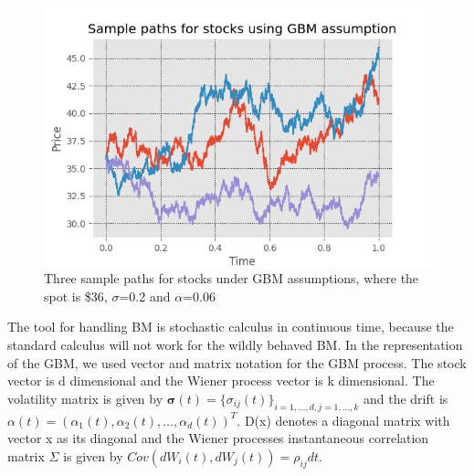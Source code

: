 \begin{figure}[th]
\centering
\includegraphics{Figures/samplePath.png}
\decoRule
\caption[Sample Path For Stocks]{Three sample paths for stocks under GBM assumptions, where the spot is \$36, $\sigma$=0.2 and $\alpha$=0.06}
\label{fig:BM}
\end{figure}

The tool for handling BM is stochastic calculus in continuous time, because the standard calculus will not work for the wildly behaved BM. In the representation of the GBM, we used vector and matrix notation for the GBM process. The stock vector is d dimensional and the Wiener process vector is k dimensional. The volatility matrix is given by $\bm{\sigma}(t)=\{\sigma_{ij}(t)\}_{i=1,\ldots,d,j=1,\ldots,k}$ and the drift is $\alpha(t)=(\alpha_1(t), \alpha_2(t), \ldots, \alpha_d(t))^T$. D(x) denotes a diagonal matrix with vector x as its diagonal and the Wiener processes instantaneous correlation matrix $\Sigma$ is given by $Cov(dW_i(t),dW_j(t))=\rho_{ij}dt$.

